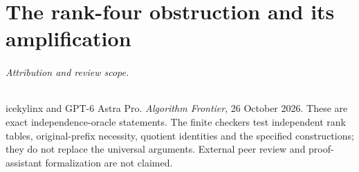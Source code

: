 \part{The rank-four obstruction and its amplification}
\setcounter{section}{0}


\paragraph{Attribution and review scope.}
icekylinx and GPT-6 Astra Pro. \emph{Algorithm Frontier}, 26 October 2026.
These are exact independence-oracle statements. The finite checkers test
independent rank tables, original-prefix necessity, quotient identities and
the specified constructions; they do not replace the universal arguments.
External peer review and proof-assistant formalization are not claimed.

